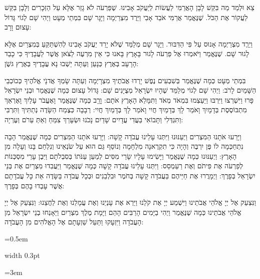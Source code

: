 \documentclass[11pt, openany]{book}
\newlength{\bidiHebWidth}
\newlength{\bidiEngWidth}
\newenvironment{bilingual}{%
  \par\vspace{4pt}%
}{%
  \noindent
  \begin{minipage}[t]{\bidiEngWidth}
    \setstretch{1.4}\emergencystretch=0.5em\normalsize
    \usebox{\bidiEngBox}
  \end{minipage}%
  \hfill
  {\color{sedergold}\vrule width 0.3pt}%
  \hfill
  \begin{minipage}[t]{\bidiHebWidth}
    \begingroup\hebrewfont\TeXXeTstate=1\beginR
    \large\setstretch{1.4}\emergencystretch=3em\tolerance=9999\parindent=0pt\relax
    \usebox{\bidiHebBox}
    \endR\endgroup
  \end{minipage}%
  \par\vspace{2pt}%
}
\newenvironment{hebrewcol}{%
  \begin{lrbox}{\bidiHebBox}\begin{minipage}{\bidiHebWidth}%
}{%
  \end{minipage}\end{lrbox}%
}
\begin{document}
\begin{bilingual}
\begin{hebrewcol}
צֵא וּלְמַד מַה בִּקֵּשׁ לָבָן הָאֲרַמִּי לַעֲשׂוֹת לְיַעֲקֹב אָבִינוּ. שֶׁפַּרְעֹה לֹא גָזַר אֶלָּא עַל הַזְּכָרִים וְלָבָן בִּקֵּשׁ לַעֲקוֹר אֶת הַכֹּל. שֶׁנֶּאֱמַר אֲרַמִּי אֹבֵד אָבִי וַיֵּרֶד מִצְרַיְמָה וַיָּגָר שָׁם בִּמְתֵי מְעָט וַיְהִי שָׁם לְגוֹי גָּדוֹל עָצוּם וָרָב:

וַיֵרֵֶד מִצְרַיְמָה אָנוּס עַל פִּי הַדִּבּוּר. וַיָּגָר שָׁם מְלַמֵּד שֶׁלֹּא יָרַד יַעֲקֹב אָבִינוּ לְהִשְׁתַּקֵּעַ בְּמִצְרַיִם אֶלָּא לָגוּר שָׁם. שֶׁנֶּאֱמַר וַיֹּאמְרוּ אֶל פַּרְעֹה לָגוּר בָּאָרֶץ בָּאנוּ כִּי אֵין מִרְעֶה לַצֹּאן אֲשֶׁר לַעֲבָדֶיךָ כִּי כָבֵד הָרָעָב בְּאֶרֶץ כְּנָעַן וְעַתָּה יֵשְׁבוּ נָא עֲבָדֶיךָ בְּאֶרֶץ גּשֶֹׁן:

בִּמְתֵי מְעָט כְּמָה שֶׁנֶּאֱמַר בְּשִׁבְעִים נֶפֶשׁ יָרְדוּ אֲבֹתֶיךָ מִצְרָיְמָה וְעַתָּה שָׂמְךָ אֲדנָֹי אֱלֹהֶיךָ כְּכוֹכְבֵי הַשָּׁמַיִם לָרֹב: וַיְהִי שָׁם לְגוֹי מְלַמֵּד שֶׁהָיוּ יִשְׂרָאֵל מְצֻיָּנִים שָׁם: גָּדוֹל עָצוּם כְּמָה שֶׁנֶּאֱמַר וּבְנֵי יִשְׂרָאֵל פָּרוּ וַיִּשְׁרְצוּ וַיִּרְבּוּ וַיַּעַצְמוּ בִּמְאֹד מְאֹד וַתִּמָּלֵא הָאָרֶץ אֹתָם: וָרָָב כְּמָה שֶׁנֶּאֱמַר וָאֶעֱבֹר עָלַיִךְ וָאֶרְאֵךְ מִתְבּוֹסֶסֶת בְּדָמָיִךְ וָאֹמַר לָךְ בְּדָמַיִךְ חֲיִי וָאֹמַר לָךְ בְּדָמַיִךְ חֲיִי: רְבָבָה כְּצֶמַח הַשָּׂדֶה נְתַתִּיךְ וַתִּרְבִּי וַתִּגְדְּלִי וַתָּבוֹאִי בַּעֲדִי עֲדָיִים שָׁדַיִם נָכֹנוּ וּשְׂעָרֵךְ צִמֵּחַ וְאַתְּ עֵרֹם וְעֶרְיָה:

וַיָּרֵעוּ אֹתָנוּ הַמִּצְרִים וַיְעַנּוּנוּ וַיִּתְּנוּ עָלֵינוּ עֲבֹדָה קָשָׁה: וַיָּרֵעוּ אֹתָנוּ הַמִּצְרִים כְּמָה שֶׁנֶּאֱמַר הָבָה נִתְחַכְּמָה לוֹ פֶּן יִרְבֶּה וְהָיָה כִּי תִקְרֶאנָה מִלְחָמָה וְנוֹסַף גַּם הוּא עַל שֹׂנְאֵינוּ וְנִלְחַם בָּנוּ וְעָלָה מִן הָאָרֶץ: וַיְעַנּוּנוּ כְּמָה שֶׁנֶּאֱמַר וַיָּשִׂימוּ עָלָיו שָׂרֵי מִסִּים לְמַעַן עַנֹּתוֹ בְּסִבְלֹתָם וַיִּבֶן עָרֵי מִסְכְּנוֹת לְפַרְעֹה אֶת פִּיתֹם וְאֶת רַעַמְסֵס: וַיִּתְּנוּ עָלֵינוּ עֲבֹדָה קָשָׁה כְּמָה שֶׁנֶּאֱמַר וַיַּעֲבִדוּ מִצְרַיִם אֶת בְּנֵי יִשְׂרָאֵל בְּפָרֶךְ: וַיְמָרֲרוּ אֶת חַיֵּיהֶם בַּעֲבֹדָה קָשָׁה בְּחֹמֶר וּבִלְבֵנִים וּבְכָל עֲבֹדָה בַּשָּׂדֶה אֵת כָּל עֲבֹדָתָם אֲשֶׁר עָבְדוּ בָהֶם בְּפָרֶךְ:

וַנִּצְעַק אֶל יְיָ אֱלֹהֵי אֲבֹתֵינוּ וַיִּשְׁמַע יְיָ אֶת קֹלֵנוּ וַיַּרְא אֶת עָנְיֵנוּ וְאֶת עֲמָלֵנוּ וְאֶת לַחֲצֵנוּ: וַנִּצְעַק אֶל יְיָ אֱלֹהֵי אֲבֹתֵינוּ כְּמָה שֶׁנֶּאֱמַר וַיְהִי בַיָּמִים הָרַבִּים הָהֵם וַיָּמָת מֶלֶךְ מִצְרַיִם וַיֵּאָנְחוּ בְנֵי יִשְׂרָאֵל מִן הָעֲבֹדָה וַיִּזְעָקוּ וַתַּעַל שַׁוְעָתָם אֶל הָאֱלֹהִים מִן הָעֲבֹדָה:


\end{hebrewcol}
\end{bilingual}
\end{document}
